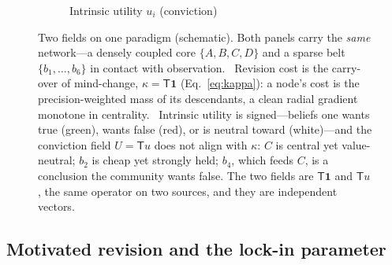 \documentclass[runningheads]{llncs}
\newcommand{\Top}{\mathsf{T}}          %
\newcommand{\bone}{\mathbf{1}}         %
\begin{document}
\begin{figure}[h!]
\begin{subfigure}{0.49\textwidth}
\caption{Intrinsic utility $u_i$ (conviction)}
\label{sub:util}
\end{subfigure}
\caption{Two fields on one paradigm (schematic). Both panels carry the \emph{same} network---a densely
coupled core $\{A,B,C,D\}$ and a sparse belt $\{b_1,\dots,b_6\}$ in contact with observation.
~Revision cost is the carry-over of mind-change, $\kappa=\Top\bone$
(Eq.~\ref{eq:kappa}): a node's cost is the precision-weighted mass of its descendants, a clean radial
gradient monotone in centrality. ~Intrinsic utility is signed---beliefs one wants
true (green), wants false (red), or is neutral toward (white)---and the conviction field
$U=\Top u$ does not align with $\kappa$: $C$ is central yet value-neutral; $b_2$ is cheap yet strongly
held; $b_4$, which feeds $C$, is a conclusion the community wants false. The two fields are
$\Top\bone$ and $\Top u$, the same operator on two sources, and they are independent vectors.}
\label{fig:twofields}
\end{figure}

\subsection{Motivated revision and the lock-in parameter}
\label{sec:revision}
\end{document}
